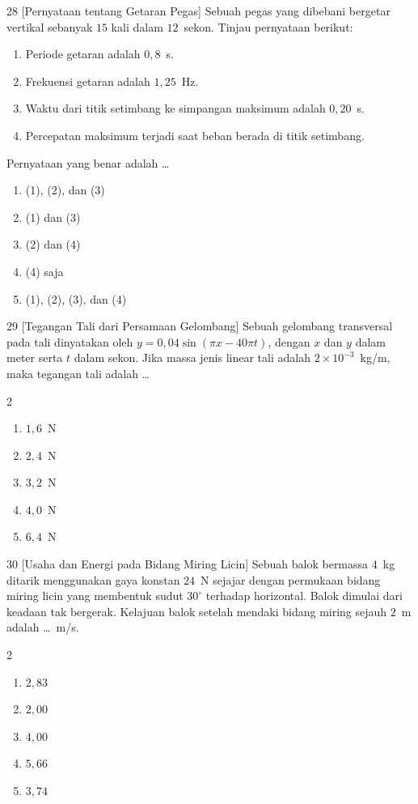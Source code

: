 \documentclass[11pt]{article}
\newenvironment{pil}{%
  \begin{enumerate}[label=(\alph*),leftmargin=*,itemsep=1pt,topsep=3pt]}%
  {\end{enumerate}}
\newenvironment{pilB}{%
  \par\smallskip\begin{multicols}{2}
  \begin{enumerate}[label=(\alph*),leftmargin=*,itemsep=1pt,topsep=3pt]}%
  {\end{enumerate}\end{multicols}}
\begin{document}
\begin{soal}{28 \normalfont\small[Pernyataan tentang Getaran Pegas]}
Sebuah pegas yang dibebani bergetar vertikal sebanyak $15$ kali dalam $12$~sekon.
Tinjau pernyataan berikut:
\begin{enumerate}[label=(\arabic*),leftmargin=*,topsep=2pt,itemsep=1pt]
  \item Periode getaran adalah $0{,}8$~s.
  \item Frekuensi getaran adalah $1{,}25$~Hz.
  \item Waktu dari titik setimbang ke simpangan maksimum adalah $0{,}20$~s.
  \item Percepatan maksimum terjadi saat beban berada di titik setimbang.
\end{enumerate}
Pernyataan yang benar adalah \ldots
\begin{pil}
  \item (1), (2), dan (3)
  \item (1) dan (3)
  \item (2) dan (4)
  \item (4) saja
  \item (1), (2), (3), dan (4)
\end{pil}
\end{soal}

\begin{soal}{29 \normalfont\small[Tegangan Tali dari Persamaan Gelombang]}
Sebuah gelombang transversal pada tali dinyatakan oleh $y=0{,}04\sin(\pi x-40\pi t)$,
dengan $x$ dan $y$ dalam meter serta $t$ dalam sekon. Jika massa jenis linear tali adalah
$2\times10^{-3}$~kg/m, maka tegangan tali adalah \ldots
\begin{pilB}
  \item $1{,}6$~N \item $2{,}4$~N \item $3{,}2$~N \item $4{,}0$~N \item $6{,}4$~N
\end{pilB}
\end{soal}

\begin{soal}{30 \normalfont\small[Usaha dan Energi pada Bidang Miring Licin]}
Sebuah balok bermassa $4$~kg ditarik menggunakan gaya konstan $24$~N sejajar dengan
permukaan bidang miring licin yang membentuk sudut $30^\circ$ terhadap horizontal.
Balok dimulai dari keadaan tak bergerak. Kelajuan balok setelah mendaki bidang miring
sejauh $2$~m adalah \ldots~m/s.
\begin{pilB}
  \item $2{,}83$ \item $2{,}00$ \item $4{,}00$ \item $5{,}66$ \item $3{,}74$
\end{pilB}
\end{soal}
\end{document}
